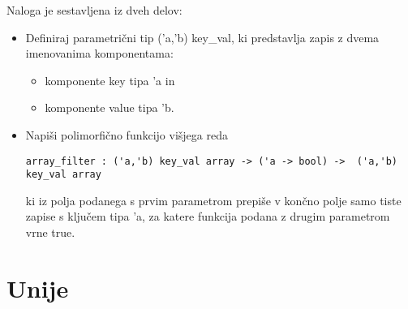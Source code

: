 \begin{ex}
  Naloga je sestavljena iz dveh delov:

\begin{itemize}
\item Definiraj parametri\v cni tip ('a,'b) key\_val, ki predstavlja
  zapis z dvema imenovanima komponentama:
  \begin{itemize}
  \item komponente key tipa 'a in
  \item komponente value tipa 'b.
  \end{itemize}
\item Napi\v si polimorfi\v cno funkcijo vi\v sjega reda

\begin{lstlisting}
array_filter : ('a,'b) key_val array -> ('a -> bool) ->  ('a,'b) key_val array
\end{lstlisting}

  ki iz polja podanega s prvim parametrom prepi\v se v kon\v cno polje
  samo tiste zapise s klju\v cem tipa 'a, za katere funkcija podana z
  drugim parametrom vrne true. \end{itemize}



\end{ex}


\section{Unije}

